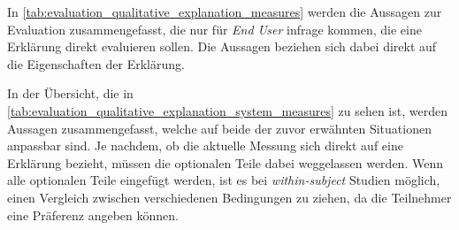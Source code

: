 In \autoref{tab:evaluation_qualitative_explanation_measures} werden die Aussagen zur Evaluation zusammengefasst, die nur für \textit{End User} infrage kommen, die eine Erklärung direkt evaluieren sollen. Die Aussagen beziehen sich dabei direkt auf die Eigenschaften der Erklärung.

In der Übersicht, die in \autoref{tab:evaluation_qualitative_explanation_system_measures} zu sehen ist, werden Aussagen zusammengefasst, welche auf beide der zuvor erwähnten Situationen anpassbar sind. Je nachdem, ob die aktuelle Messung sich direkt auf eine Erklärung bezieht, müssen die optionalen Teile dabei weggelassen werden. Wenn alle optionalen Teile eingefügt werden, ist es bei \textit{within-subject} Studien möglich, einen Vergleich zwischen verschiedenen Bedingungen zu ziehen, da die Teilnehmer eine Präferenz angeben können.

